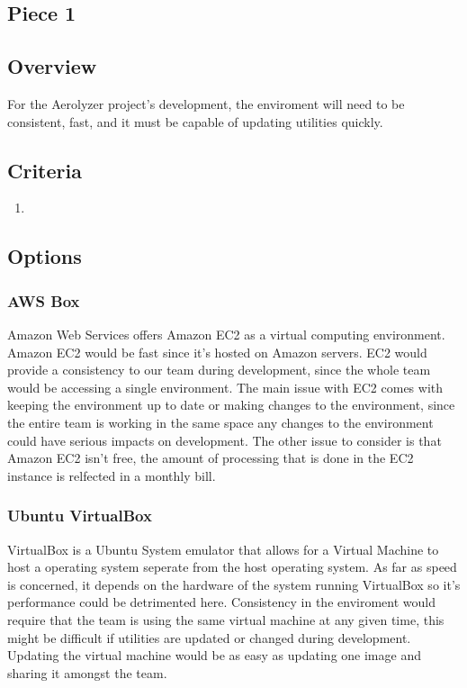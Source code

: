 \documentclass[onecolumn, draftclsnofoot,10pt, compsoc]{IEEEtran}
\begin{document}
\begin{singlespace}
\section{Piece 1}
\subsection{Overview}
For the Aerolyzer project's development, the enviroment will need to be consistent, fast, and it must be capable of updating utilities quickly.
\subsection{Criteria}
\begin{enumerate}
\item
\end{enumerate}
\subsection{Options}
\subsubsection{AWS Box}
Amazon Web Services offers Amazon EC2 as a virtual computing environment.
Amazon EC2 would be fast since it's hosted on Amazon servers.
EC2 would provide a consistency to our team during development, since the whole team would be accessing a single environment.
The main issue with EC2 comes with keeping the environment up to date or making changes to the environment, since the entire team is working in the same space any changes to the environment could have serious impacts on development. 
The other issue to consider is that Amazon EC2 isn't free, the amount of processing that is done in the EC2 instance is relfected in a monthly bill.
\subsubsection{Ubuntu VirtualBox}
VirtualBox is a Ubuntu System emulator that allows for a Virtual Machine to host a operating system seperate from the host operating system.
As far as speed is concerned, it depends on the hardware of the system running VirtualBox so it's performance could be detrimented here.
Consistency in the enviroment would require that the team is using the same virtual machine at any given time, this might be difficult if utilities are updated or changed during development.
Updating the virtual machine would be as easy as updating one image and sharing it amongst the team. 

\end{singlespace}
\end{document}

